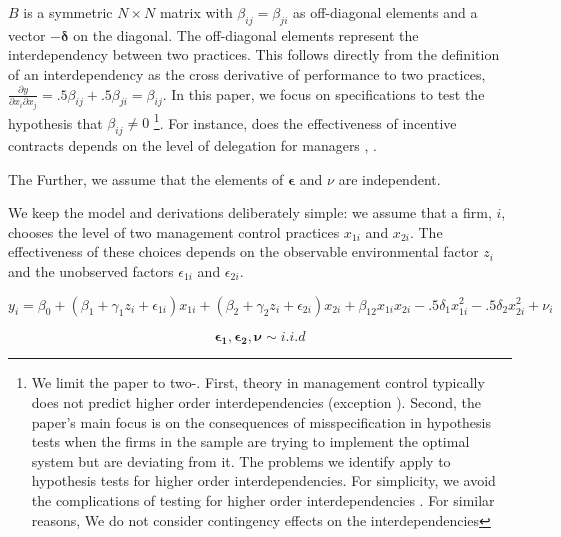 \documentclass[12pt]{article}
\begin{document}
$B$ is a symmetric $N \times N$ matrix with $\beta_{ij} = \beta_{ji}$ as off-diagonal elements and a vector $-\mathbf{\delta}$ on the diagonal. The off-diagonal elements represent the interdependency between two practices. This follows directly from the definition of an interdependency as the cross derivative of performance to two practices, $\frac{\partial y}{\partial x_i \partial x_j} = .5 \beta_{ij} + .5 \beta_{ji} = \beta_{ij}$. In this paper, we focus on specifications to test the hypothesis that $\beta_{ij} \neq 0$ \footnote{We limit the paper to two-. First, theory in management control typically does not predict higher order interdependencies (exception \citet{Aral2012}). Second, the paper's main focus is on the consequences of misspecification in hypothesis tests when the firms in the sample are trying to implement the optimal system but are deviating from it. The problems we identify apply to hypothesis tests for higher order interdependencies. For simplicity, we avoid the complications of testing for higher order interdependencies \citep{Carree2011}. For similar reasons, We do not consider contingency effects on the interdependencies}. For instance, does the effectiveness of incentive contracts depends on the level of delegation for managers \citep{Moers2006}, .  

The 
Further, we assume that the elements of $\mathbf{\epsilon}$ and $\nu$ are independent. 


We keep the model and
derivations deliberately simple: we assume that a firm, \(i\), chooses
the level of two management control practices \(x_{1i}\) and \(x_{2i}\).
The effectiveness of these choices depends on the observable
environmental factor \(z_i\) and the unobserved factors
\(\epsilon_{1i}\) and \(\epsilon_{2i}\).

\begin{equation} \label{eq:structural}
y_i = \beta_0 + (\beta_1 + \gamma_1 z_i + \epsilon_{1i}) x_{1i}
                 + (\beta_2 + \gamma_2 z_i + \epsilon_{2i}) x_{2i}
                 + \beta_{12} x_{1i} x_{2i}
                 - .5 \delta_1 x^2_{1i} - .5 \delta_2 x^2_{2i} + \nu_i
\end{equation}

\[
\mathbf{\epsilon_{1}}, \mathbf{\epsilon_{2}}, \mathbf{\nu} \sim i.i.d
\]
\end{document}
